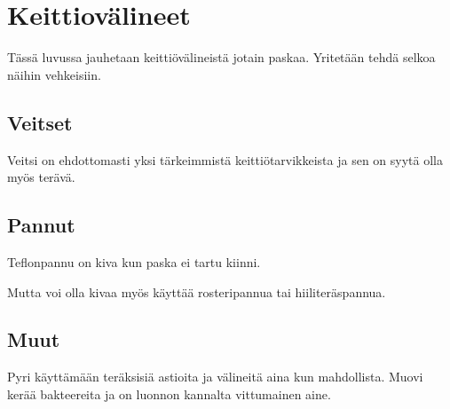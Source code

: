 \documentclass[../keittiokirja.tex]{subfiles}
\begin{document}
\chapter{Keittiovälineet}
\label{chp:keittiovalineet}

Tässä luvussa jauhetaan keittiövälineistä jotain paskaa. Yritetään tehdä selkoa näihin vehkeisiin.

\section{Veitset}

Veitsi on ehdottomasti yksi tärkeimmistä keittiötarvikkeista ja sen on syytä olla myös terävä.

\section{Pannut}

Teflonpannu on kiva kun paska ei tartu kiinni.

Mutta voi olla kivaa myös käyttää rosteripannua tai hiiliteräspannua.

\section{Muut}

Pyri käyttämään teräksisiä astioita ja välineitä aina kun mahdollista. Muovi kerää bakteereita 
ja on luonnon kannalta vittumainen aine.
\end{document}
